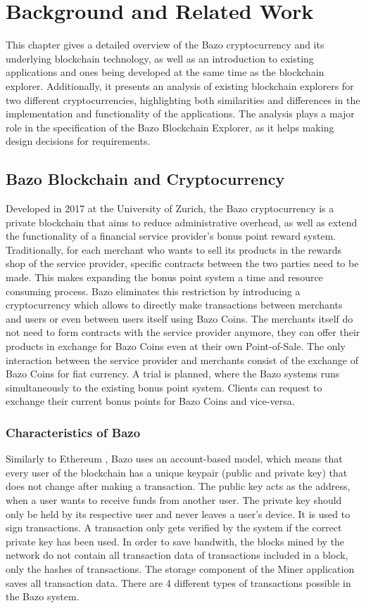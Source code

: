 \chapter{Background and Related Work}
This chapter gives a detailed overview of the Bazo cryptocurrency and its underlying blockchain technology, as well as an introduction to existing applications and ones being developed at the same time as the blockchain explorer. Additionally, it presents an analysis of existing blockchain explorers for two different cryptocurrencies, highlighting both similarities and differences in the implementation and functionality of the applications. The analysis plays a major role in the specification of the Bazo Blockchain Explorer, as it helps making design decisions for requirements.

\section{Bazo Blockchain and Cryptocurrency}
Developed in 2017 at the University of Zurich, the Bazo cryptocurrency is a private blockchain that aims to reduce administrative overhead, as well as extend the functionality of a financial service provider's bonus point reward system. Traditionally, for each merchant who wants to sell its products in the rewards shop of the service provider, specific contracts between the two parties need to be made. This makes expanding the bonus point system a time and resource consuming process. Bazo eliminates this restriction by introducing a cryptocurrency which allows to directly make transactions between merchants and users or even between users itself using Bazo Coins. The merchants itself do not need to form contracts with the service provider anymore, they can offer their products in exchange for Bazo Coins even at their own Point-of-Sale. The only interaction between the service provider and merchants consist of the exchange of Bazo Coins for fiat currency. A trial is planned, where the Bazo systems runs simultaneously to the existing bonus point system. Clients can request to exchange their current bonus points for Bazo Coins and vice-versa.

\subsection{Characteristics of Bazo}
Similarly to Ethereum \cite{ethereum}, Bazo uses an account-based model, which means that every user of the blockchain has a unique keypair (public and private key) that does not change after making a transaction. The public key acts as the address, when a user wants to receive funds from another user. The private key should only be held by its respective user and never leaves a user's device. It is used to sign transactions. A transaction only gets verified by the system if the correct private key has been used. In order to save bandwith, the blocks mined by the network do not contain all transaction data of transactions included in a block, only the hashes of transactions. The storage component of the Miner application saves all transaction data. There are 4 different types of transactions possible in the Bazo system.

